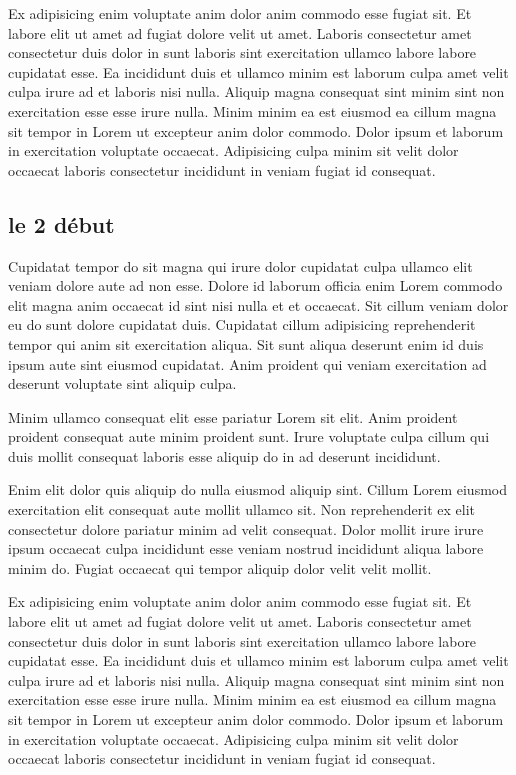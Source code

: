 \documentclass[a4paper,10pt,french]{sphinxmanual}
\begin{document}
Ex adipisicing enim voluptate anim dolor anim commodo esse fugiat sit. Et labore elit ut amet ad fugiat dolore velit ut amet. Laboris consectetur amet consectetur duis dolor in sunt laboris sint exercitation ullamco labore labore cupidatat esse. Ea incididunt duis et ullamco minim est laborum culpa amet velit culpa irure ad et laboris nisi nulla. Aliquip magna consequat sint minim sint non exercitation esse esse irure nulla. Minim minim ea est eiusmod ea cillum magna sit tempor in Lorem ut excepteur anim dolor commodo. Dolor ipsum et laborum in exercitation voluptate occaecat. Adipisicing culpa minim sit velit dolor occaecat laboris consectetur incididunt in veniam fugiat id consequat.


\subsection{le 2 début}
\label{\detokenize{docs/refs/autocad-refs:le-2-debut}}
Cupidatat tempor do sit magna qui irure dolor cupidatat culpa ullamco elit veniam dolore aute ad non esse. Dolore id laborum officia enim Lorem commodo elit magna anim occaecat id sint nisi nulla et et occaecat. Sit cillum veniam dolor eu do sunt dolore cupidatat duis. Cupidatat cillum adipisicing reprehenderit tempor qui anim sit exercitation aliqua. Sit sunt aliqua deserunt enim id duis ipsum aute sint eiusmod cupidatat. Anim proident qui veniam exercitation ad deserunt voluptate sint aliquip culpa.

Minim ullamco consequat elit esse pariatur Lorem sit elit. Anim proident proident consequat aute minim proident sunt. Irure voluptate culpa cillum qui duis mollit consequat laboris esse aliquip do in ad deserunt incididunt.

Enim elit dolor quis aliquip do nulla eiusmod aliquip sint. Cillum Lorem eiusmod exercitation elit consequat aute mollit ullamco sit. Non reprehenderit ex elit consectetur dolore pariatur minim ad velit consequat. Dolor mollit irure irure ipsum occaecat culpa incididunt esse veniam nostrud incididunt aliqua labore minim do. Fugiat occaecat qui tempor aliquip dolor velit velit mollit.

Ex adipisicing enim voluptate anim dolor anim commodo esse fugiat sit. Et labore elit ut amet ad fugiat dolore velit ut amet. Laboris consectetur amet consectetur duis dolor in sunt laboris sint exercitation ullamco labore labore cupidatat esse. Ea incididunt duis et ullamco minim est laborum culpa amet velit culpa irure ad et laboris nisi nulla. Aliquip magna consequat sint minim sint non exercitation esse esse irure nulla. Minim minim ea est eiusmod ea cillum magna sit tempor in Lorem ut excepteur anim dolor commodo. Dolor ipsum et laborum in exercitation voluptate occaecat. Adipisicing culpa minim sit velit dolor occaecat laboris consectetur incididunt in veniam fugiat id consequat.
\end{document}
